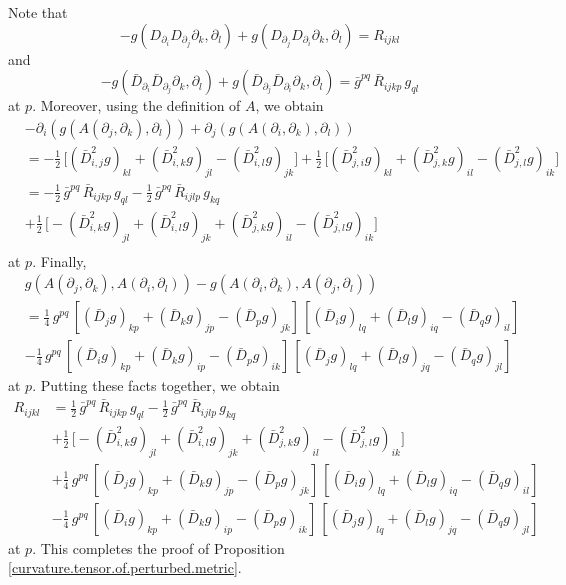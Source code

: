 \documentclass[11pt]{amsart}
\theoremstyle{definition}
\begin{document}
Note that 
\[-g(D_{\partial_i} D_{\partial_j} \partial_k,\partial_l) + g(D_{\partial_j} D_{\partial_i} \partial_k,\partial_l) = R_{ijkl}\] 
and 
\[-g(\bar{D}_{\partial_i} \bar{D}_{\partial_j} \partial_k,\partial_l) + g(\bar{D}_{\partial_j} \bar{D}_{\partial_i} \partial_k,\partial_l) = \bar{g}^{pq} \, \bar{R}_{ijkp} \, g_{ql}\] 
at $p$. Moreover, using the definition of $A$, we obtain 
\begin{align*} 
&- \partial_i(g(A(\partial_j,\partial_k),\partial_l)) + \partial_j(g(A(\partial_i,\partial_k),\partial_l)) \\ 
&= -\frac{1}{2} \, \big [ (\bar{D}_{i,j}^2 g)_{kl} + (\bar{D}_{i,k}^2 g)_{jl} - (\bar{D}_{i,l}^2 g)_{jk} \big ] + \frac{1}{2} \, \big [ (\bar{D}_{j,i}^2 g)_{kl} + (\bar{D}_{j,k}^2 g)_{il} - (\bar{D}_{j,l}^2 g)_{ik} \big ] \\ 
&= -\frac{1}{2} \, \bar{g}^{pq} \, \bar{R}_{ijkp} \, g_{ql} - \frac{1}{2} \, \bar{g}^{pq} \, \bar{R}_{ijlp} \, g_{kq} \\ 
&+ \frac{1}{2} \, \big [ -(\bar{D}_{i,k}^2 g)_{jl} + (\bar{D}_{i,l}^2 g)_{jk} + (\bar{D}_{j,k}^2 g)_{il} - (\bar{D}_{j,l}^2 g)_{ik} \big ] \\ 
\end{align*} 
at $p$. Finally, 
\begin{align*}
&g(A(\partial_j,\partial_k),A(\partial_i,\partial_l)) - g(A(\partial_i,\partial_k),A(\partial_j,\partial_l)) \\ 
&= \frac{1}{4} \, g^{pq} \, [(\bar{D}_j g)_{kp} + (\bar{D}_k g)_{jp} - (\bar{D}_p g)_{jk}] \, [(\bar{D}_i g)_{lq} + (\bar{D}_l g)_{iq} - (\bar{D}_q g)_{il}] \\ 
&- \frac{1}{4} \, g^{pq} \, [(\bar{D}_i g)_{kp} + (\bar{D}_k g)_{ip} - (\bar{D}_p g)_{ik}] \, [(\bar{D}_j g)_{lq} + (\bar{D}_l g)_{jq} - (\bar{D}_q g)_{jl}] 
\end{align*} 
at $p$. Putting these facts together, we obtain 
\begin{align*} 
R_{ijkl} 
&= \frac{1}{2} \, \bar{g}^{pq} \, \bar{R}_{ijkp} \, g_{ql} - \frac{1}{2} \, \bar{g}^{pq} \, \bar{R}_{ijlp} \, g_{kq} \\ 
&+ \frac{1}{2} \, \big [ -(\bar{D}_{i,k}^2 g)_{jl} + (\bar{D}_{i,l}^2 g)_{jk} + (\bar{D}_{j,k}^2 g)_{il} - (\bar{D}_{j,l}^2 g)_{ik} \big ] \\ 
&+ \frac{1}{4} \, g^{pq} \, [(\bar{D}_j g)_{kp} + (\bar{D}_k g)_{jp} - (\bar{D}_p g)_{jk}] \, [(\bar{D}_i g)_{lq} + (\bar{D}_l g)_{iq} - (\bar{D}_q g)_{il}] \\ 
&- \frac{1}{4} \, g^{pq} \, [(\bar{D}_i g)_{kp} + (\bar{D}_k g)_{ip} - (\bar{D}_p g)_{ik}] \, [(\bar{D}_j g)_{lq} + (\bar{D}_l g)_{jq} - (\bar{D}_q g)_{jl}] 
\end{align*} 
at $p$. This completes the proof of Proposition \ref{curvature.tensor.of.perturbed.metric}. \\
\end{document}
